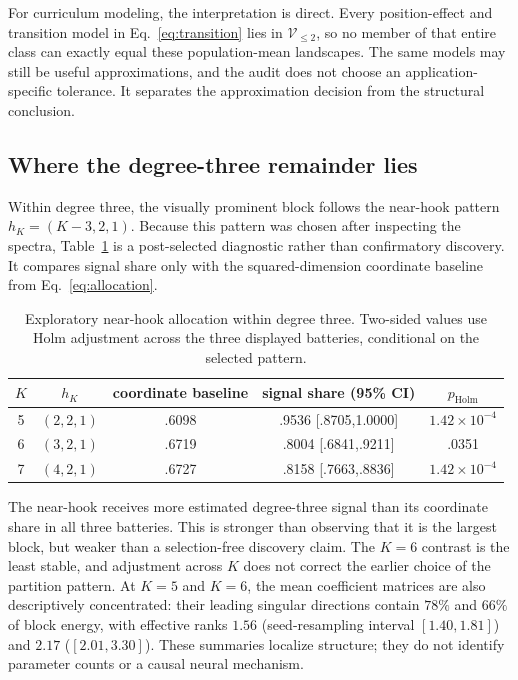 \documentclass{article}
\begin{document}
For curriculum modeling, the interpretation is direct. Every position-effect and transition model in Eq.~\eqref{eq:transition} lies in $\mathcal V_{\leq2}$, so no member of that entire class can exactly equal these population-mean landscapes. The same models may still be useful approximations, and the audit does not choose an application-specific tolerance. It separates the approximation decision from the structural conclusion.

\subsection{Where the degree-three remainder lies}

Within degree three, the visually prominent block follows the near-hook pattern $h_K=(K-3,2,1)$. Because this pattern was chosen after inspecting the spectra, Table~\ref{tab:allocation} is a post-selected diagnostic rather than confirmatory discovery. It compares signal share only with the squared-dimension coordinate baseline from Eq.~\eqref{eq:allocation}.

\begin{table}[t]
  \caption{Exploratory near-hook allocation within degree three. Two-sided values use Holm adjustment across the three displayed batteries, conditional on the selected pattern.}
  \label{tab:allocation}
  \centering
  \small
  \begin{tabular}{@{}ccccc@{}}
    \toprule
    $K$ & $h_K$ & coordinate baseline & signal share (95\% CI) & $p_{\mathrm{Holm}}$ \\
    \midrule
    5 & $(2,2,1)$ & .6098 & .9536 [.8705,1.0000] & $1.42\!\times\!10^{-4}$ \\
    6 & $(3,2,1)$ & .6719 & .8004 [.6841,.9211] & .0351 \\
    7 & $(4,2,1)$ & .6727 & .8158 [.7663,.8836] & $1.42\!\times\!10^{-4}$ \\
    \bottomrule
  \end{tabular}
\end{table}

The near-hook receives more estimated degree-three signal than its coordinate share in all three batteries. This is stronger than observing that it is the largest block, but weaker than a selection-free discovery claim. The $K=6$ contrast is the least stable, and adjustment across $K$ does not correct the earlier choice of the partition pattern. At $K=5$ and $K=6$, the mean coefficient matrices are also descriptively concentrated: their leading singular directions contain $78\%$ and $66\%$ of block energy, with effective ranks $1.56$ (seed-resampling interval $[1.40,1.81]$) and $2.17$ ($[2.01,3.30]$). These summaries localize structure; they do not identify parameter counts or a causal neural mechanism.
\end{document}
